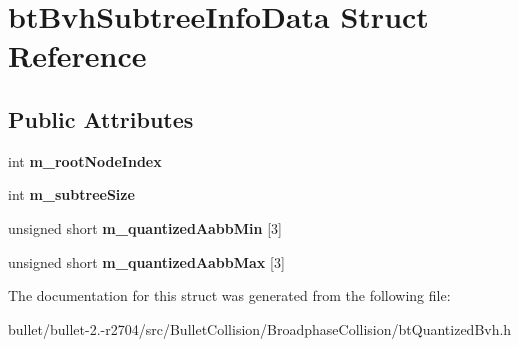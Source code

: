 \hypertarget{structbt_bvh_subtree_info_data}{\section{bt\+Bvh\+Subtree\+Info\+Data Struct Reference}
\label{structbt_bvh_subtree_info_data}
}
\subsection*{Public Attributes}
\begin{DoxyCompactItemize}
\item 
\hypertarget{structbt_bvh_subtree_info_data_aba9a231e428f528a1c28bb65d6b19362}{int {\bfseries m\+\_\+root\+Node\+Index}}\label{structbt_bvh_subtree_info_data_aba9a231e428f528a1c28bb65d6b19362}

\item 
\hypertarget{structbt_bvh_subtree_info_data_a3192c8388d50c9183282bb0b8aca0e95}{int {\bfseries m\+\_\+subtree\+Size}}\label{structbt_bvh_subtree_info_data_a3192c8388d50c9183282bb0b8aca0e95}

\item 
\hypertarget{structbt_bvh_subtree_info_data_a1a3bbdb46f71f1fc03be0f3857f86db8}{unsigned short {\bfseries m\+\_\+quantized\+Aabb\+Min} \mbox{[}3\mbox{]}}\label{structbt_bvh_subtree_info_data_a1a3bbdb46f71f1fc03be0f3857f86db8}

\item 
\hypertarget{structbt_bvh_subtree_info_data_a40b42d278b19d394da9138093eb0a1c1}{unsigned short {\bfseries m\+\_\+quantized\+Aabb\+Max} \mbox{[}3\mbox{]}}\label{structbt_bvh_subtree_info_data_a40b42d278b19d394da9138093eb0a1c1}

\end{DoxyCompactItemize}


The documentation for this struct was generated from the following file\+:\begin{DoxyCompactItemize}
\item 
bullet/bullet-\/2.-\/r2704/src/\+Bullet\+Collision/\+Broadphase\+Collision/bt\+Quantized\+Bvh.\+h\end{DoxyCompactItemize}
